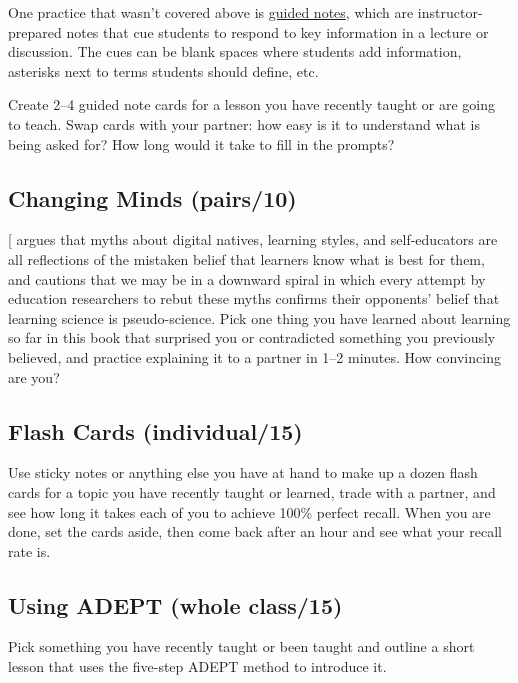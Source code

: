 One practice that wasn't covered above is \protect\hyperlink{g:guided-notes}{guided
notes}, which are instructor-prepared notes that cue
students to respond to key information in a lecture or discussion. The
cues can be blank spaces where students add information, asterisks
next to terms students should define, etc.

Create 2--4 guided note cards for a lesson you have recently taught or
are going to teach. Swap cards with your partner: how easy is it to
understand what is being asked for? How long would it take to fill in
the prompts?

\subsection{Changing Minds (pairs/10)}\label{changing-minds-pairs10}

{[}\protect[\hyperlink{b:Kirs2013}{Kirs2013}]{]} argues that myths about digital natives, learning
styles, and self-educators are all reflections of the mistaken belief
that learners know what is best for them, and cautions that we may be in
a downward spiral in which every attempt by education researchers to
rebut these myths confirms their opponents' belief that learning science
is pseudo-science. Pick one thing you have learned about learning so far
in this book that surprised you or contradicted something you previously
believed, and practice explaining it to a partner in 1--2 minutes. How
convincing are you?

\subsection{Flash Cards (individual/15)}\label{flash-cards-individual15}

Use sticky notes or anything else you have at hand to make up a dozen
flash cards for a topic you have recently taught or learned, trade with
a partner, and see how long it takes each of you to achieve 100\% perfect
recall. When you are done, set the cards aside, then come back after an
hour and see what your recall rate is.

\subsection{Using ADEPT (whole class/15)}\label{using-adept-whole-class15}

Pick something you have recently taught or been taught and outline a
short lesson that uses the five-step ADEPT method to introduce it.

